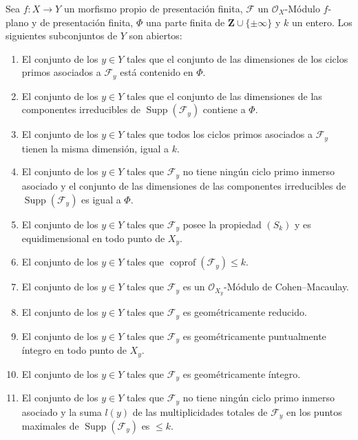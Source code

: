 \begin{theorem}[12.2.1]
\label{IV.12.2.1}
Sea $f:X\to Y$ un morfismo propio de presentación finita, $\mathcal F$ un $\mathcal O_X$-Módulo $f$-plano y de presentación finita, $\Phi$ una parte finita de $\mathbf Z\cup\{\pm\infty\}$ y $k$ un entero.
Los siguientes subconjuntos de $Y$ son abiertos:
\begin{enumerate}[label=\textup{(\roman*)}]
  \item El conjunto de los $y\in Y$ tales que el conjunto de las dimensiones de los ciclos primos asociados a $\mathcal F_y$ está contenido en $\Phi$.
  \item El conjunto de los $y\in Y$ tales que el conjunto de las dimensiones de las componentes irreducibles de $\operatorname{Supp}(\mathcal F_y)$ contiene a $\Phi$.
  \item El conjunto de los $y\in Y$ tales que todos los ciclos primos asociados a $\mathcal F_y$ tienen la misma dimensión, igual a $k$.
  \item El conjunto de los $y\in Y$ tales que $\mathcal F_y$ no tiene ningún ciclo primo inmerso asociado y el conjunto de las dimensiones de las componentes irreducibles de $\operatorname{Supp}(\mathcal F_y)$ es igual a $\Phi$.
  \item El conjunto de los $y\in Y$ tales que $\mathcal F_y$ posee la propiedad $(S_k)$ y es equidimensional en todo punto de $X_y$.
  \item El conjunto de los $y\in Y$ tales que $\operatorname{coprof}(\mathcal F_y)\leq k$.
  \item El conjunto de los $y\in Y$ tales que $\mathcal F_y$ es un $\mathcal O_{X_y}$-Módulo de Cohen--Macaulay.
  \item El conjunto de los $y\in Y$ tales que $\mathcal F_y$ es geométricamente reducido.
  \item El conjunto de los $y\in Y$ tales que $\mathcal F_y$ es geométricamente puntualmente íntegro en todo punto de $X_y$.
  \item El conjunto de los $y\in Y$ tales que $\mathcal F_y$ es geométricamente íntegro.
  \item El conjunto de los $y\in Y$ tales que $\mathcal F_y$ no tiene ningún ciclo primo inmerso asociado y la suma $l(y)$ de las multiplicidades totales  de $\mathcal F_y$ en los puntos maximales de $\operatorname{Supp}(\mathcal F_y)$ es $\leq k$.
\end{enumerate}
\end{theorem}


